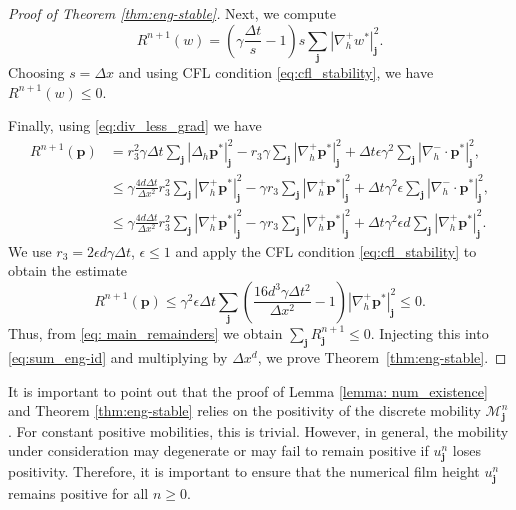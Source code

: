 \documentclass[11pt]{article}
\numberwithin{equation}{section}
\newtheorem{counter example}[theorem]{Counter Example}
\numberwithin{equation}{section}
\numberwithin{equation}{section}
\begin{document}
\begin{proof}[Proof of Theorem  \ref{thm:eng-stable}]
Next, we compute
\begin{equation}
\label{eq:remaind_w-star}
R^{n+1}(w)=\left(\gamma\frac{\Delta t}{s}-1\right)s\sum_{\mathbf{j}}|\nabla_h^+ w^*|_{\mathbf{j}}^2.
\end{equation}
Choosing $s=\Delta x$ and using CFL condition \eqref{eq:cfl_stability}, we have $R^{n+1}(w)\leq 0$.

Finally, using \eqref{eq:div_less_grad} we have
\begin{equation}
\begin{aligned}
R^{n+1}(\mathbf p)&= r_3^2\gamma\Delta t \sum_{\mathbf{j}}|\Delta_h \mathbf{p}^*|_{\mathbf{j}}^2 -r_3\gamma\sum_{\mathbf{j}}|\nabla_h^+ \mathbf{p}^*|_{\mathbf{j}}^2+\Delta t \epsilon \gamma^2 \sum_{\mathbf{j}}|\nabla_h^- \cdot\mathbf{p}^*|_{\mathbf{j}}^2,\\
&\leq \gamma\frac{4d\Delta t}{\Delta x^2}r_3^2\sum_{\mathbf{j}}|\nabla_h^+\mathbf{p}^*|_{\mathbf{j}}^2 -\gamma r_3\sum_{\mathbf{j}}|\nabla_h^+\mathbf{p}^*|_{\mathbf{j}}^2+\Delta t\gamma^2\epsilon\sum_{\mathbf{j}}|\nabla_h^- \cdot\mathbf{p}^*|_{\mathbf{j}}^2,\\
&\leq \gamma\frac{4d\Delta t}{\Delta x^2}r_3^2\sum_{\mathbf{j}}|\nabla_h^+\mathbf{p}^*|_{\mathbf{j}}^2-\gamma r_3\sum_{\mathbf{j}}|\nabla_h^+\mathbf{p}^*|_{\mathbf{j}}^2+\Delta t\gamma^2\epsilon d\sum_{\mathbf{j}}|\nabla_h^+\mathbf{p}^*|_{\mathbf{j}}^2.
\end{aligned}
\end{equation}
We use $r_3=2\epsilon d\gamma\Delta t$, $\epsilon\leq 1$ and apply the CFL condition \eqref{eq:cfl_stability} to obtain the estimate
\begin{equation}
 R^{n+1}(\mathbf{p})\leq\gamma^2\epsilon\Delta t\sum_{\mathbf{j}}\left(\frac{16d^3\gamma\Delta t^2}{\Delta x^2}-1\right)|\nabla_h^+\mathbf{p}^*|_{\mathbf{j}}^2\leq 0.
\end{equation}
Thus, from \eqref{eq: main_remainders} we obtain $\sum_{\mathbf{j}}R_{\mathbf{j}}^{n+1}\leq 0$. Injecting this into \eqref{eq:sum_eng-id} and multiplying by $\Delta x^d$, we prove Theorem~\ref{thm:eng-stable}.
\end{proof}
It is important to point out that the proof of Lemma \ref{lemma: num_existence} and Theorem  \ref{thm:eng-stable} relies on the positivity of the discrete mobility $\mathcal{M}_{\mathbf{j}}^n$. For constant positive mobilities, this is trivial. However, in general, the mobility under consideration may degenerate or may fail to remain positive if $u_{\mathbf{j}}^n$ loses positivity. Therefore, it is important to ensure that the numerical film height $u_{\mathbf{j}}^n$ remains positive for all $n\geq 0$. 
\end{document}
